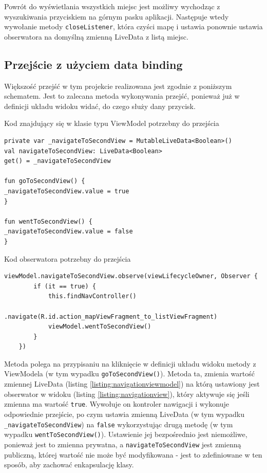 \documentclass[polish,polish,a4paper,12pt]{article}
\begin{document}
	Powrót do wyświetlania wszystkich miejsc jest możliwy wychodząc z wyszukiwania przyciskiem na górnym pasku aplikacji. Następuje wtedy wywołanie metody \texttt{closeListener}, która czyści mapę i ustawia ponownie ustawia obserwatora na domyślną zmienną LiveData z listą miejsc.

	\subsection{Przejście z użyciem data binding}\label{navigation}

	Większość przejść w tym projekcie realizowana jest zgodnie z poniższym schematem. Jest to zalecana metoda wykonywania przejść, ponieważ już w definicji układu widoku widać, do czego służy dany przycisk.

	\begin{listing}[H]
		\caption{Kod znajdujący się w klasie typu ViewModel potrzebny do przejścia}
		\begin{verbatim}
private var _navigateToSecondView = MutableLiveData<Boolean>()
val navigateToSecondView: LiveData<Boolean>
get() = _navigateToSecondView

fun goToSecondView() {
_navigateToSecondView.value = true
}

fun wentToSecondView() {
_navigateToSecondView.value = false
}
		\end{verbatim}
		\label{listing:navigationviewmodel}
	\end{listing}

	\begin{listing}[H]
		\caption{Kod obserwatora potrzebny do przejścia}
		\begin{verbatim}
viewModel.navigateToSecondView.observe(viewLifecycleOwner, Observer {
		if (it == true) {
			this.findNavController()
				.navigate(R.id.action_mapViewFragment_to_listViewFragment)
			viewModel.wentToSecondView()
		}
	})
		\end{verbatim}
		\label{listing:navigationview}
	\end{listing}

	Metoda polega na przypisaniu na kliknięcie w definicji układu widoku metody z ViewModela (w tym wypadku \texttt{goToSecondView()}). Metoda ta, zmienia wartość zmiennej LiveData (listing \ref{listing:navigationviewmodel}) na którą ustawiony jest obserwator w widoku (listing \ref{listing:navigationview}), który aktywuje się jeśli zmienna ma wartość \texttt{true}. Wywołuje on kontroler nawigacji i wykonuje odpowiednie przejście, po czym ustawia zmienną LiveData (w tym wypadku \texttt{\_navigateToSecondView}) na \texttt{false} wykorzystując drugą metodę (w tym wypadku \texttt{wentToSecondView()}). Ustawienie jej bezpośrednio jest niemożliwe, ponieważ jest to zmienna prywatna, a \texttt{navigateToSecondView} jest zmienną publiczną, której wartość nie może być modyfikowana - jest to zdefiniowane w ten sposób, aby zachować enkapsulację klasy.
\end{document}
